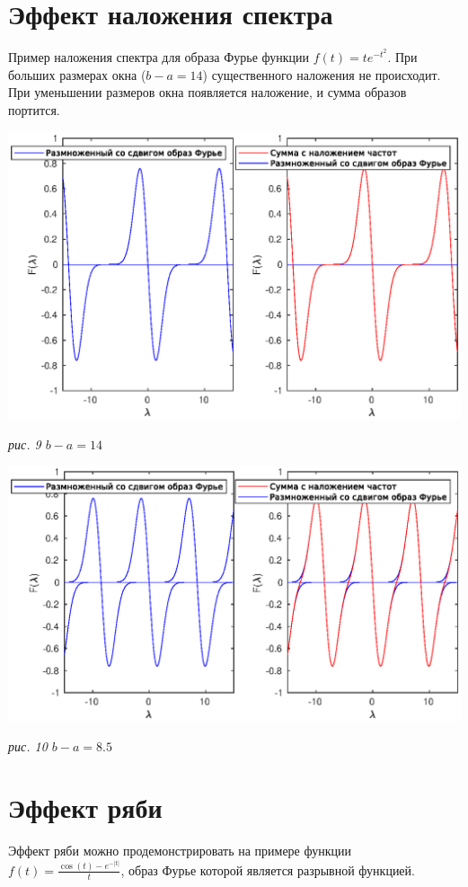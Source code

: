 \documentclass[11pt]{article}
\begin{document}
\newpage
\section{Эффект наложения спектра}
Пример наложения спектра для образа Фурье функции $ f\left(t\right) = te^{-t^2} $.
При больших размерах окна ($b - a = 14$) существенного наложения не происходит. При уменьшении 
размеров окна появляется наложение, и сумма образов портится. 

\includegraphics[width=1.0\textwidth]{aliasing1.eps}
\begin{center}
\it{рис. 9 \quad $b - a = 14$}
\end{center}

\includegraphics[width=1.0\textwidth]{aliasing2.eps}
\begin{center}
\it{рис. 10 \quad $b - a = 8.5$}
\end{center}


\newpage
\section{Эффект ряби}
Эффект ряби можно продемонстрировать на примере функции 
$f\left(t\right) = \frac{\cos\left(t\right)-e^{-\lvert t\rvert}}{t}$, образ Фурье которой
является разрывной функцией.
\end{document}
